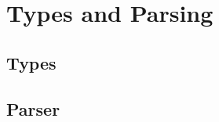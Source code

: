\section{Types and Parsing}
\label{sec:types}
\subsection{Types}
\label{subsec:types}

\subsection{Parser}
\label{subsec:parser}
